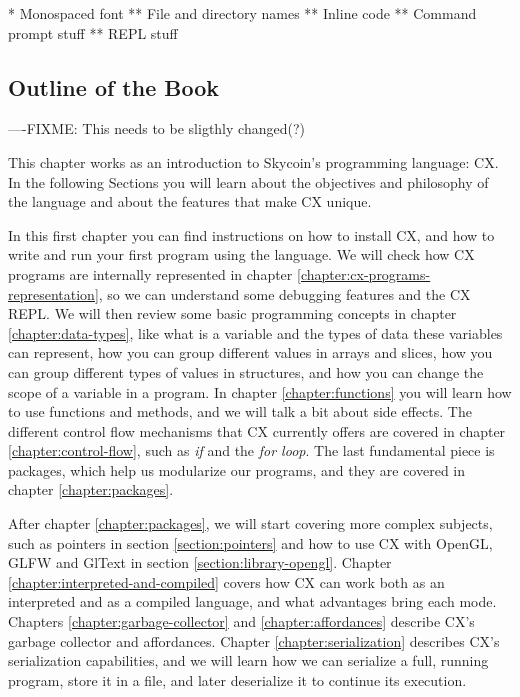 \documentclass[11pt,fleqn,openany]{book} %
\begin{document}
* Monospaced font
** File and directory names
** Inline code
** Command prompt stuff
** REPL stuff

\subsection{Outline of the Book}

%

----FIXME: This needs to be sligthly changed(?)

This chapter works as an introduction to Skycoin's programming language: CX. In the following Sections you will learn about the objectives and philosophy of the language and about the features that make CX unique.

In this first chapter you can find instructions on how to install CX, and how to write and run your first program using the language. We will check how CX programs are internally represented in chapter \ref{chapter:cx-programs-representation}, so we can understand some debugging features and the CX REPL. We will then review some basic programming concepts in chapter \ref{chapter:data-types}, like what is a variable and the types of data these variables can represent, how you can group different values in arrays and slices, how you can group different types of values in structures, and how you can change the scope of a variable in a program. In chapter \ref{chapter:functions} you will learn how to use functions and methods, and we will talk a bit about side effects. The different control flow mechanisms that CX currently offers are covered in chapter \ref{chapter:control-flow}, such as \textit{if} and the \textit{for loop}. The last fundamental piece is packages, which help us modularize our programs, and they are covered in chapter \ref{chapter:packages}.

After chapter \ref{chapter:packages}, we will start covering more complex subjects, such as pointers in section \ref{section:pointers} and how to use CX with OpenGL, GLFW and GlText in section \ref{section:library-opengl}. Chapter \ref{chapter:interpreted-and-compiled} covers how CX can work both as an interpreted and as a compiled language, and what advantages bring each mode. Chapters \ref{chapter:garbage-collector} and \ref{chapter:affordances} describe CX's garbage collector and affordances.%
 Chapter \ref{chapter:serialization} describes CX's serialization capabilities, and we will learn how we can serialize a full, running program, store it in a file, and later deserialize it to continue its execution.
\end{document}
